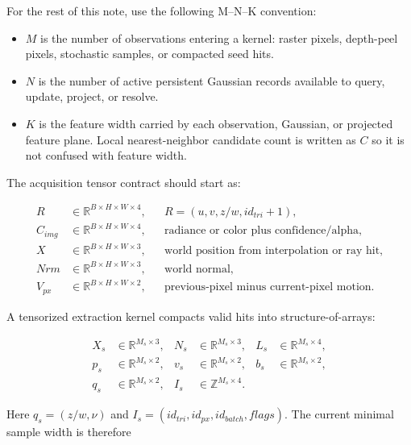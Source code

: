 \documentclass[11pt]{article}
\begin{document}
For the rest of this note, use the following M--N--K convention:

\begin{itemize}
  \item $M$ is the number of observations entering a kernel: raster pixels,
        depth-peel pixels, stochastic samples, or compacted seed hits.
  \item $N$ is the number of active persistent Gaussian records available to
        query, update, project, or resolve.
  \item $K$ is the feature width carried by each observation, Gaussian, or
        projected feature plane. Local nearest-neighbor candidate count is
        written as $C$ so it is not confused with feature width.
\end{itemize}

The acquisition tensor contract should start as:

\[
\begin{aligned}
  R      &\in \mathbb{R}^{B\times H\times W\times 4},
          &&R=(u,v,z/w,id_{tri}+1),\\
  C_{img}&\in \mathbb{R}^{B\times H\times W\times 4},
          &&\text{radiance or color plus confidence/alpha},\\
  X      &\in \mathbb{R}^{B\times H\times W\times 3},
          &&\text{world position from interpolation or ray hit},\\
  Nrm    &\in \mathbb{R}^{B\times H\times W\times 3},
          &&\text{world normal},\\
  V_{px} &\in \mathbb{R}^{B\times H\times W\times 2},
          &&\text{previous-pixel minus current-pixel motion}.
\end{aligned}
\]

A tensorized extraction kernel compacts valid hits into structure-of-arrays:

\[
\begin{aligned}
  X_s       &\in \mathbb{R}^{M_s\times 3}, &
  N_s       &\in \mathbb{R}^{M_s\times 3}, &
  L_s       &\in \mathbb{R}^{M_s\times 4},\\
  p_s       &\in \mathbb{R}^{M_s\times 2}, &
  v_s       &\in \mathbb{R}^{M_s\times 2}, &
  b_s       &\in \mathbb{R}^{M_s\times 2},\\
  q_s       &\in \mathbb{R}^{M_s\times 2}, &
  I_s       &\in \mathbb{Z}^{M_s\times 4}. &
\end{aligned}
\]

Here $q_s=(z/w,\nu)$ and $I_s=(id_{tri},id_{px},id_{batch},flags)$. The
current minimal sample width is therefore
\end{document}
